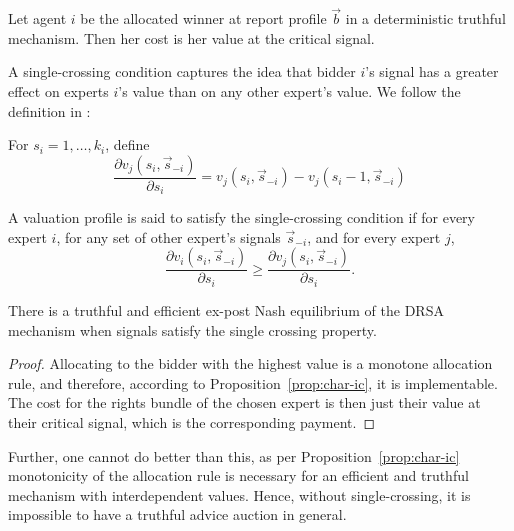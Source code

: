 \begin{prop}\label{prop:deterministic_payment}
	Let agent $i$ be the allocated winner at report profile $\vec{b}$ in a deterministic truthful mechanism. Then her cost is her value at the critical signal.
\end{prop}

A single-crossing condition captures the idea that bidder $i$'s signal has a greater effect on experts $i$'s value than on any other expert's value. We follow the definition in \citep{eden2018interdependent}:

For $s_i = 1, \ldots, k_i$, define $$\frac{\partial v_j(s_i, \vec{s}_{-i})}{\partial s_i} = v_j(s_i, \vec{s}_{-i}) - v_j(s_i - 1, \vec{s}_{-i})$$

\begin{defn}
	A valuation profile is said to satisfy the single-crossing condition if for every expert $i$, for any set of other expert's  signals $\vec{s}_{-i}$, and for every expert $j$, $$\frac{\partial v_i(s_i, \vec{s}_{-i})}{\partial s_i} \geq \frac{\partial v_j(s_i, \vec{s}_{-i})}{\partial s_i}.$$
\end{defn}



\begin{thm}
	There is a truthful and efficient ex-post Nash equilibrium of the DRSA mechanism when signals satisfy the single crossing property.
\end{thm}

\begin{proof}
Allocating to the bidder with the highest value is a monotone allocation rule, and therefore, according to Proposition~\ref{prop:char-ic}, it is implementable. The cost for the rights bundle of the chosen expert is then just their value at their critical signal, which is the corresponding payment.
\end{proof}

Further, one cannot do better than this, as per Proposition~\ref{prop:char-ic} monotonicity of the allocation rule is necessary for an efficient and truthful mechanism with interdependent values. Hence, without single-crossing, it is impossible to have a truthful advice auction in general.

